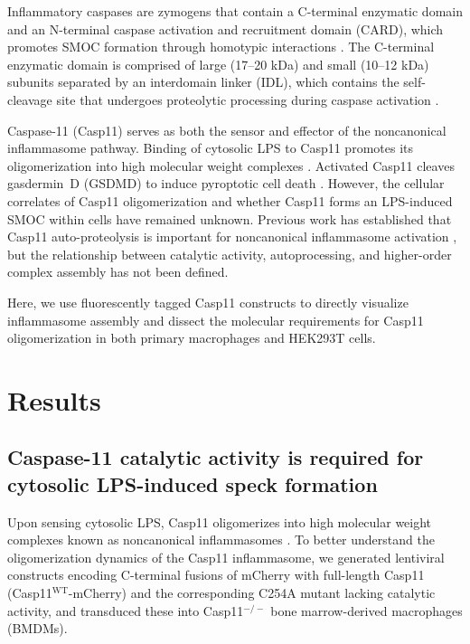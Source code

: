\documentclass[11pt]{article}
\begin{document}
Inflammatory caspases are zymogens that contain a C-terminal enzymatic domain and an N-terminal caspase activation and recruitment domain (CARD), which promotes SMOC formation through homotypic interactions \citep{martinon2009,rathinam2012}. The C-terminal enzymatic domain is comprised of large (17--20 kDa) and small (10--12 kDa) subunits separated by an interdomain linker (IDL), which contains the self-cleavage site that undergoes proteolytic processing during caspase activation \citep{boatright2003}.

Caspase-11 (Casp11) serves as both the sensor and effector of the noncanonical inflammasome pathway. Binding of cytosolic LPS to Casp11 promotes its oligomerization into high molecular weight complexes \citep{shi2014,hagar2013,kayagaki2011}. Activated Casp11 cleaves gasdermin~D (GSDMD) to induce pyroptotic cell death \citep{kayagaki2015,shi2015}. However, the cellular correlates of Casp11 oligomerization and whether Casp11 forms an LPS-induced SMOC within cells have remained unknown. Previous work has established that Casp11 auto-proteolysis is important for noncanonical inflammasome activation \citep{lee2018,ross2018}, but the relationship between catalytic activity, autoprocessing, and higher-order complex assembly has not been defined.

Here, we use fluorescently tagged Casp11 constructs to directly visualize inflammasome assembly and dissect the molecular requirements for Casp11 oligomerization in both primary macrophages and HEK293T cells.

\section{Results}

\subsection{Caspase-11 catalytic activity is required for cytosolic LPS-induced speck formation}

Upon sensing cytosolic LPS, Casp11 oligomerizes into high molecular weight complexes known as noncanonical inflammasomes \citep{shi2014}. To better understand the oligomerization dynamics of the Casp11 inflammasome, we generated lentiviral constructs encoding C-terminal fusions of mCherry with full-length Casp11 (Casp11$^{\text{WT}}$-mCherry) and the corresponding C254A mutant lacking catalytic activity, and transduced these into Casp11$^{-/-}$ bone marrow-derived macrophages (BMDMs).
\end{document}
